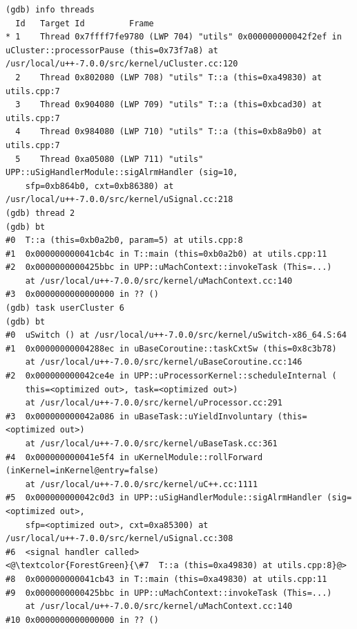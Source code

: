 \begin{lstlisting}[caption={Context switch version of task command}, label={pushtask-id}]
(gdb) info threads
  Id   Target Id         Frame
* 1    Thread 0x7ffff7fe9780 (LWP 704) "utils" 0x000000000042f2ef in uCluster::processorPause (this=0x73f7a8) at /usr/local/u++-7.0.0/src/kernel/uCluster.cc:120
  2    Thread 0x802080 (LWP 708) "utils" T::a (this=0xa49830) at utils.cpp:7
  3    Thread 0x904080 (LWP 709) "utils" T::a (this=0xbcad30) at utils.cpp:7
  4    Thread 0x984080 (LWP 710) "utils" T::a (this=0xb8a9b0) at utils.cpp:7
  5    Thread 0xa05080 (LWP 711) "utils" UPP::uSigHandlerModule::sigAlrmHandler (sig=10,
    sfp=0xb864b0, cxt=0xb86380) at /usr/local/u++-7.0.0/src/kernel/uSignal.cc:218
(gdb) thread 2
(gdb) bt
#0  T::a (this=0xb0a2b0, param=5) at utils.cpp:8
#1  0x000000000041cb4c in T::main (this=0xb0a2b0) at utils.cpp:11
#2  0x0000000000425bbc in UPP::uMachContext::invokeTask (This=...)
    at /usr/local/u++-7.0.0/src/kernel/uMachContext.cc:140
#3  0x0000000000000000 in ?? ()
(gdb) task userCluster 6
(gdb) bt
#0  uSwitch () at /usr/local/u++-7.0.0/src/kernel/uSwitch-x86_64.S:64
#1  0x00000000004288ec in uBaseCoroutine::taskCxtSw (this=0x8c3b78)
    at /usr/local/u++-7.0.0/src/kernel/uBaseCoroutine.cc:146
#2  0x000000000042ce4e in UPP::uProcessorKernel::scheduleInternal (
    this=<optimized out>, task=<optimized out>)
    at /usr/local/u++-7.0.0/src/kernel/uProcessor.cc:291
#3  0x000000000042a086 in uBaseTask::uYieldInvoluntary (this=<optimized out>)
    at /usr/local/u++-7.0.0/src/kernel/uBaseTask.cc:361
#4  0x000000000041e5f4 in uKernelModule::rollForward (inKernel=inKernel@entry=false)
    at /usr/local/u++-7.0.0/src/kernel/uC++.cc:1111
#5  0x000000000042c0d3 in UPP::uSigHandlerModule::sigAlrmHandler (sig=<optimized out>,
    sfp=<optimized out>, cxt=0xa85300) at /usr/local/u++-7.0.0/src/kernel/uSignal.cc:308
#6  <signal handler called>
<@\textcolor{ForestGreen}{\#7  T::a (this=0xa49830) at utils.cpp:8}@>
#8  0x000000000041cb43 in T::main (this=0xa49830) at utils.cpp:11
#9  0x0000000000425bbc in UPP::uMachContext::invokeTask (This=...)
    at /usr/local/u++-7.0.0/src/kernel/uMachContext.cc:140
#10 0x0000000000000000 in ?? ()
\end{lstlisting}

